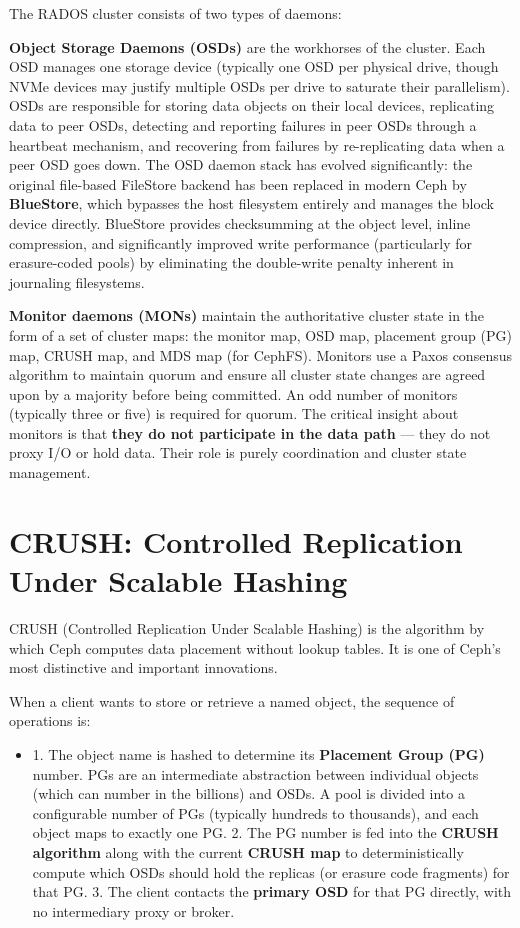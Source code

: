 The RADOS cluster consists of two types of daemons:

\textbf{Object Storage Daemons (OSDs)} are the workhorses of the cluster. Each OSD manages one storage device (typically one OSD per physical drive, though NVMe devices may justify multiple OSDs per drive to saturate their parallelism). OSDs are responsible for storing data objects on their local devices, replicating data to peer OSDs, detecting and reporting failures in peer OSDs through a heartbeat mechanism, and recovering from failures by re-replicating data when a peer OSD goes down. The OSD daemon stack has evolved significantly: the original file-based FileStore backend has been replaced in modern Ceph by \textbf{BlueStore}, which bypasses the host filesystem entirely and manages the block device directly. BlueStore provides checksumming at the object level, inline compression, and significantly improved write performance (particularly for erasure-coded pools) by eliminating the double-write penalty inherent in journaling filesystems.

\textbf{Monitor daemons (MONs)} maintain the authoritative cluster state in the form of a set of cluster maps: the monitor map, OSD map, placement group (PG) map, CRUSH map, and MDS map (for CephFS). Monitors use a Paxos consensus algorithm to maintain quorum and ensure all cluster state changes are agreed upon by a majority before being committed. An odd number of monitors (typically three or five) is required for quorum. The critical insight about monitors is that \textbf{they do not participate in the data path} --- they do not proxy I/O or hold data. Their role is purely coordination and cluster state management.

\section{CRUSH: Controlled Replication Under Scalable Hashing}
CRUSH (Controlled Replication Under Scalable Hashing) is the algorithm by which Ceph computes data placement without lookup tables. It is one of Ceph's most distinctive and important innovations.

When a client wants to store or retrieve a named object, the sequence of operations is:

\begin{itemize}
  \item 1. The object name is hashed to determine its \textbf{Placement Group (PG)} number. PGs are an intermediate abstraction between individual objects (which can number in the billions) and OSDs. A pool is divided into a configurable number of PGs (typically hundreds to thousands), and each object maps to exactly one PG.
2. The PG number is fed into the \textbf{CRUSH algorithm} along with the current \textbf{CRUSH map} to deterministically compute which OSDs should hold the replicas (or erasure code fragments) for that PG.
3. The client contacts the \textbf{primary OSD} for that PG directly, with no intermediary proxy or broker.
\end{itemize}


